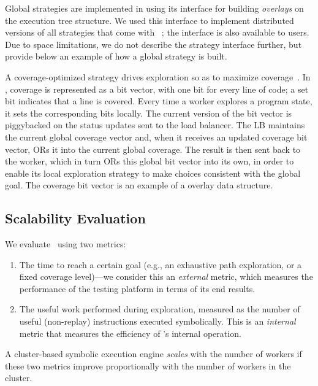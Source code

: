 Global strategies are implemented in \cnine using its interface for building {\em overlays} on the execution tree structure.  We used this interface to implement distributed versions of all strategies that come with \klee~\cite{klee}; the interface is also available to \cnine users.  Due to space limitations, we do not describe the strategy interface further, but provide below an example of how a global strategy is built.

A coverage-optimized strategy drives exploration so as to maximize coverage~\cite{klee}.  In \cnine, coverage is represented as a bit vector, with one bit for every line of code; a set bit indicates that a line is covered.  Every time a worker explores a program state, it sets the corresponding bits locally. The current version of the bit vector is piggybacked on the status updates sent to the load balancer.  The LB maintains the current global coverage vector and, when it receives an updated coverage bit vector, {\small OR}s it into the current global coverage.  The result is then sent back to the worker, which in turn {\small OR}s this global bit vector into its own, in order to enable its local exploration strategy to make choices consistent with the global goal.  The coverage bit vector is an example of a \cnine overlay data structure.

\subsection{Scalability Evaluation}
\label{sec:scalability}

We evaluate \cnine\ using two metrics:
\begin{enumerate}
\item The time to reach a certain goal (e.g., an exhaustive path exploration, or a fixed coverage level)---we consider this an \emph{external} metric, which measures the performance of the testing platform in terms of its end results.
\item The useful work performed during exploration, measured as the number of useful (non-replay) instructions executed symbolically. This is an \emph{internal} metric that measures the efficiency of \cnine's internal operation. 
\end{enumerate}

A cluster-based symbolic execution engine \emph{scales} with the number of workers if these two metrics improve proportionally with the number of workers in the cluster.

